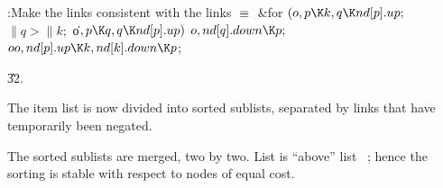 \B{}:Make the  links consistent with the  links%
\X${}\equiv{}$\6
\&{for} ${}(\|o,\39\|p\K\|k,\39\|q\K\\{nd}[\|p].\\{up};{}$ ${}\|q>\|k;{}$ %
\|o${},\39\|p\K\|q,\39\|q\K\\{nd}[\|p].\\{up}){}$\1\5
${}\|o,\39\\{nd}[\|q].\\{down}\K\|p;{}$\2\6
${}\\{oo},\39\\{nd}[\|p].\\{up}\K\|k,\39\\{nd}[\|k].\\{down}\K\|p{}$;\par
\U32.\fi

The item list is now divided into sorted sublists, separated by links
that have temporarily been negated.

The sorted sublists are merged, two by two. List  is ``above'' list~%
;
hence the sorting is stable with respect to nodes of equal cost.


